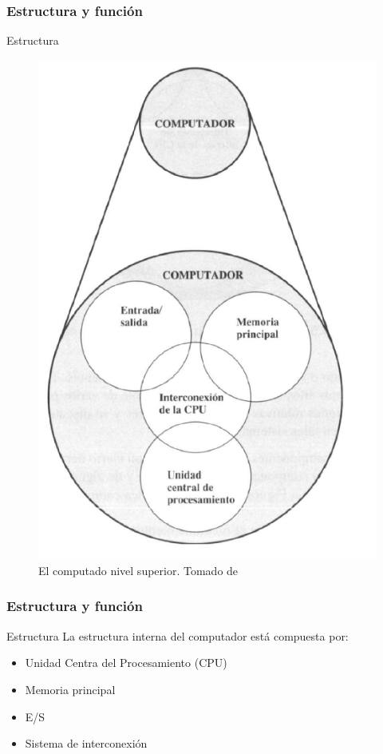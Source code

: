 \documentclass{beamer}
\begin{document}
	\begin{frame}
 		\frametitle{Estructura y función}
		\begin{block}{Estructura}
\begin{figure}[H]
\centering
\includegraphics[scale=0.27]{imagenes/pc9.png}
\caption{El computado nivel superior. Tomado de \cite{stallings}}
\end{figure}
		\end{block}
	\end{frame}	
		
	\begin{frame}
 		\frametitle{Estructura y función}
		\begin{block}{Estructura}
		La estructura interna del computador está compuesta por:
		\begin{itemize}
			\item Unidad Centra del Procesamiento (CPU)
			\item Memoria principal
			\item E/S
			\item Sistema de interconexión
		\end{itemize}
		\end{block}
	\end{frame}
\end{document}
